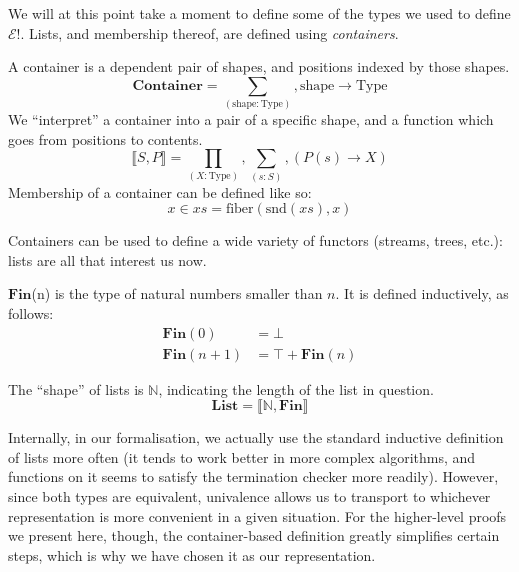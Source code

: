 We will at this point take a moment to define some of the types we used to
define \(\mathcal{E}!\).
Lists, and membership thereof, are defined using \emph{containers}.
\begin{rm-definition}[Container] \label{container-def}
  A container \cite{abbottContainersConstructingStrictly2005} is a dependent
  pair of shapes, and positions indexed by those shapes. 
  \begin{equation}
    \mathbf{Container} = \sum_{(\text{shape} : \text{Type})} , \text{shape} \rightarrow \text{Type}
  \end{equation}
  We ``interpret'' a container into a pair of a specific shape, and a function
  which goes from positions to contents.
  \begin{equation}
    \llbracket S , P \rrbracket = \prod_{(X : \text{Type})} , \sum_{(s : S)} , \left( P(s) \rightarrow X \right)
  \end{equation}
  Membership of a container can be defined like so:
  \begin{equation}
    x \in \mathit{xs} = \text{fiber}(\text{snd}(\mathit{xs}), x)
  \end{equation}
\end{rm-definition}
Containers can be used to define a wide variety of functors (streams, trees,
etc.): lists are all that interest us now.
\begin{rm-definition}
  \(\mathbf{Fin}\)(n) is the type of natural numbers smaller than \(n\).
  It is defined inductively, as follows:
  \begin{equation}
    \begin{aligned}
      \mathbf{Fin}(0) &= \bot \\
      \mathbf{Fin}(n + 1) &= \top + \mathbf{Fin}(n)
    \end{aligned}
  \end{equation}
\end{rm-definition}
\begin{rm-definition}[Lists]
  The ``shape'' of lists is \(\mathbb{N}\), indicating the length of the list in
  question.
  \begin{equation}
    \mathbf{List} = \llbracket \mathbb{N} , \mathbf{Fin} \rrbracket
  \end{equation}
\end{rm-definition}

Internally, in our formalisation, we actually use the standard
inductive definition of lists more often (it tends to work better in more
complex algorithms, and functions on it seems to satisfy the termination
checker more readily).
However, since both types are equivalent, univalence allows us to transport to
whichever representation is more convenient in a given situation.
For the higher-level proofs we present here, though, the container-based
definition greatly simplifies certain steps, which is why we have chosen it as
our representation.
